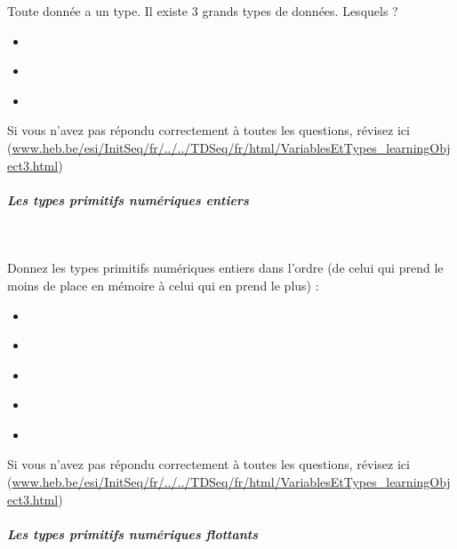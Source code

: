 \documentclass[11pt,a4paper]{article}
\begin{document}
								Toute donn\'ee a un type. Il existe 3 grands types de donn\'ees. Lesquels ?
							
					\begin{itemize}
				
			\item  \textcolor{gray}{\underline{\hspace*{16em}}} 
			\item  \textcolor{gray}{\underline{\hspace*{16em}}} 
			\item  \textcolor{gray}{\underline{\hspace*{20em}}} 
					\end{itemize}
				Si vous n'avez pas r\'epondu correctement \`a toutes les questions, 
				    r\'evisez ici (\url{www.heb.be/esi/InitSeq/fr/../../TDSeq/fr/html/VariablesEtTypes\_learningObject3.html})
            \par
        
			
		\subparagraph{Les types primitifs num\'eriques entiers} 
		
                \textcolor{white}{.} \par
             
								Donnez les types primitifs num\'eriques entiers dans l'ordre (de celui qui prend le moins de place en m\'emoire \`a celui qui en prend le plus) :
							
					\begin{itemize}
				
			\item  \textcolor{gray}{\underline{\hspace*{3em}}} 
			\item  \textcolor{gray}{\underline{\hspace*{3em}}} 
			\item  \textcolor{gray}{\underline{\hspace*{3em}}} 
			\item  \textcolor{gray}{\underline{\hspace*{2em}}} 
			\item  \textcolor{gray}{\underline{\hspace*{3em}}} 
					\end{itemize}
				Si vous n'avez pas r\'epondu correctement \`a toutes les questions, 
				    r\'evisez ici (\url{www.heb.be/esi/InitSeq/fr/../../TDSeq/fr/html/VariablesEtTypes\_learningObject3.html})
            \par
        
			
		\subparagraph{Les types primitifs num\'eriques flottants} 
		
\end{document}
